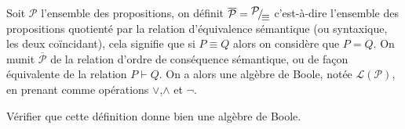 \begin{defi}
    Soit $\mathcal P$ l'ensemble des propositions, on définit $\overline{\mathcal P} = \quot{\mathcal P}{\equiv}$ c'est-à-dire l'ensemble des propositions quotienté par la relation d'équivalence sémantique (ou syntaxique, les deux coïncidant), cela signifie que si $P\equiv Q$ alors on considère que $P=Q$.
    On munit $\overline{\mathcal P}$ de la relation d'ordre de conséquence sémantique, ou de façon équivalente de la relation $P\vdash Q$. On a alors une algèbre de Boole, notée $\mathcal L(\mathcal P)$, en prenant comme opérations $\lor$,$\land$ et $\lnot$.
\end{defi}

\begin{exo}
    Vérifier que cette définition donne bien une algèbre de Boole.
\end{exo}

\newpage
\thispagestyle{empty}